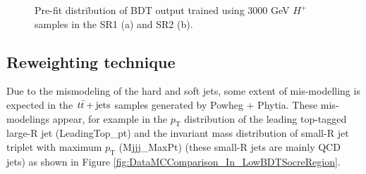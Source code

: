 \begin{figure}[H]
  \caption{Pre-fit distribution of BDT output trained using 3000 GeV $H^{+}$ samples in the SR1 (a) and SR2 (b).}
  \label{fig:DataMCComparison_BDT_Hp3000_beforeRW}
\end{figure}

\subsection{Reweighting technique}
\label{subsec:ReweightingTechnique}
Due to the mismodeling of the hard and soft jets, some extent of mis-modelling is expected in the $t\Bar{t}+\text{jets}$ samples generated by Powheg + Phytia. These mis-modelings appear, for example  in the $p_\text{T}$ distribution of the leading top-tagged large-R jet (LeadingTop\_pt) and the invariant mass distribution of small-R jet triplet with maximum $p_{\text{T}}$ (Mjjj\_MaxPt) (these small-R jets are mainly QCD jets) as shown in Figure \ref{fig:DataMCComparison_In_LowBDTSocreRegion}.

